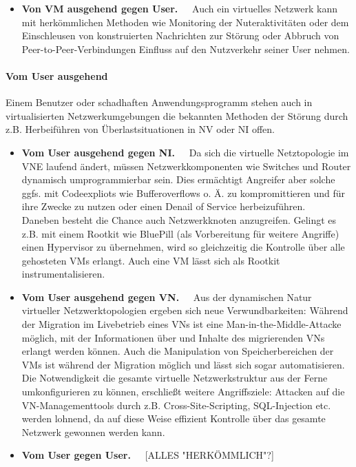 \begin{itemize}
\item \textbf{Von VM ausgehend gegen User.~~}
Auch ein virtuelles Netzwerk kann mit herkömmlichen Methoden wie Monitoring der Nuteraktivitäten oder dem Einschleusen von konstruierten Nachrichten zur Störung oder Abbruch von Peer-to-Peer-Verbindungen Einfluss auf den Nutzverkehr seiner User nehmen.
\end{itemize}



\paragraph{Vom User ausgehend}
\label{parag:vonUser}
Einem Benutzer oder schadhaften Anwendungsprogramm stehen auch in virtualisierten Netzwerkumgebungen die bekannten Methoden der Störung durch z.B. Herbeiführen von Überlastsituationen in NV oder NI offen.

\begin{itemize}
	\item \textbf{Vom User ausgehend gegen NI.~~}
	Da sich die virtuelle Netztopologie im VNE laufend ändert, müssen Netzwerkkomponenten wie Switches und Router dynamisch umprogrammierbar sein. Dies ermächtigt Angreifer aber solche ggfs. mit Codeexpliots wie Bufferoverflows o. Ä. zu kompromittieren und für ihre Zwecke zu nutzen oder einen Denail of Service herbeizuführen.\\
	Daneben besteht die Chance auch Netzwerkknoten anzugreifen. Gelingt es z.B. mit einem Rootkit wie BluePill \cite{rutkowska2008bluepilling} (als Vorbereitung für weitere Angriffe) einen Hypervisor zu übernehmen, wird so gleichzeitig die Kontrolle über alle gehosteten VMs erlangt. Auch eine VM lässt sich als Rootkit instrumentalisieren.\cite{wu2010network}
	\item \textbf{Vom User ausgehend gegen VN.~~}
	Aus der dynamischen Natur virtueller Netzwerktopologien ergeben sich neue Verwundbarkeiten: Während der Migration im Livebetrieb eines VNs ist eine Man-in-the-Middle-Attacke möglich, mit der Informationen über und Inhalte des migrierenden VNs erlangt werden können. \cite{natarajansecurity} Auch die Manipulation von Speicherbereichen der VMs ist während der Migration möglich und lässt sich sogar automatisieren.\cite{oberheide2008empirical}\\
	Die Notwendigkeit die gesamte virtuelle Netzwerkstruktur aus der Ferne umkonfigurieren zu können, erschließt weitere Angriffsziele: Attacken auf die VN-Managementtools durch z.B. Cross-Site-Scripting, SQL-Injection etc. werden lohnend, da auf diese Weise effizient Kontrolle über das gesamte Netzwerk gewonnen werden kann.	
	\item \textbf{Vom User gegen User.~~}
	[ALLES "HERKÖMMLICH"?]
\end{itemize}

